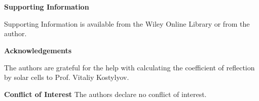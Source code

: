 \documentclass{WileyMSP-template}
\begin{document}
\\
\\



\medskip
\textbf{Supporting Information} \par %
Supporting Information is available from the Wiley Online Library or from the author.



\medskip
\textbf{Acknowledgements} \par %
The authors are grateful for the help with calculating the coefficient of reflection by solar cells to Prof. Vitaliy Kostylyov.

\medskip
\textbf{Conflict of Interest}
The authors declare no conflict of interest.

\medskip








\end{document}
